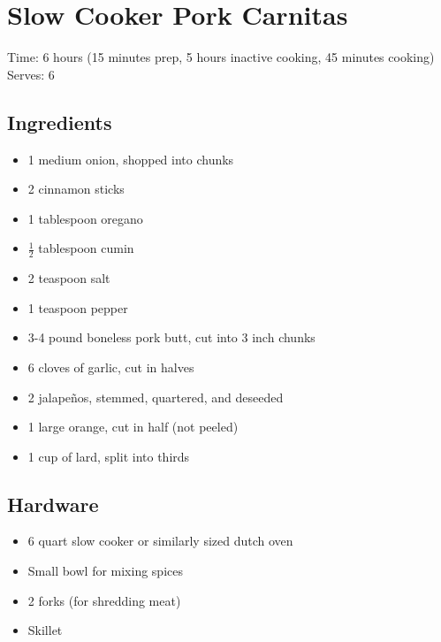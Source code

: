 \section{Slow Cooker Pork Carnitas}
\label{slowCookerPorkCarnitas}
Time: 6 hours (15 minutes prep, 5 hours inactive cooking, 45 minutes cooking)
Serves: 6

\begin{multicols}{2}
\subsection*{Ingredients}
\begin{itemize}
    \item 1 medium onion, shopped into chunks
    \item 2 cinnamon sticks
    \item 1 tablespoon oregano
    \item \( \frac{1}{2} \) tablespoon cumin
    \item 2 teaspoon salt
    \item 1 teaspoon pepper
    \item 3-4 pound boneless pork butt, cut into 3 inch chunks
    \item 6 cloves of garlic, cut in halves
    \item 2 jalapeños, stemmed, quartered, and deseeded
    \item 1 large orange, cut in half (not peeled)
    \item 1 cup of lard, split into thirds
\end{itemize}

\subsection*{Hardware}
\begin{itemize}
    \item 6 quart slow cooker or similarly sized dutch oven
    \item Small bowl for mixing spices
    \item 2 forks (for shredding meat)
    \item Skillet
\end{itemize}
\clearpage


\end{multicols}
